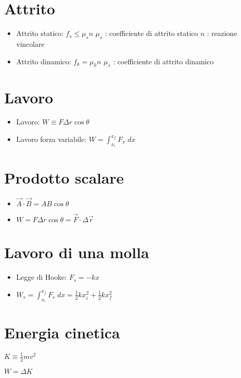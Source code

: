 \documentclass[a4paper,14pt,landscape]{extarticle}
\begin{document}
\begin{multicols*}{2}
    \section*{Attrito}
    \begin{itemize}
        \item Attrito statico: $f_s \leq \mu_s n$ \newline
              $\mu_s$ : coefficiente di attrito statico \newline
              $n$ : reazione vincolare
        \item Attrito dinamico: $f_k = \mu_k n$ \newline
              $\mu_s$ : coefficiente di attrito dinamico
    \end{itemize}

    \newpage

    \section*{Lavoro}
    \begin{itemize}
        \item Lavoro: $W \equiv F \Delta r \cos{\theta}$
        \item Lavoro forza variabile: $W= \int_{x_i}^{x_f} F_x \; dx$
    \end{itemize}

    \section*{Prodotto scalare}
    \begin{itemize}
        \item $\vec{A} \cdot \vec{B} = AB\cos{\theta}$
        \item $W = F \Delta r \cos{\theta} = \vec{F} \cdot \Delta \vec{r}$
    \end{itemize}

    \section*{Lavoro di una molla}
    \begin{itemize}
        \item Legge di Hooke: $F_s = -kx$
        \item $W_s = \int_{x_i}^{x_f} F_s \; dx = \tfrac{1}{2}kx_i^2 + \tfrac{1}{2}kx_f^2$
    \end{itemize}

    \section*{Energia cinetica}
    \begin{itemize}
        \begin{multicols*}{3}
            \item $K \equiv \tfrac{1}{2} mv^2$
            \item $W = \Delta K$
        \end{multicols*}
    \end{itemize}


\end{multicols*}
\end{document}
